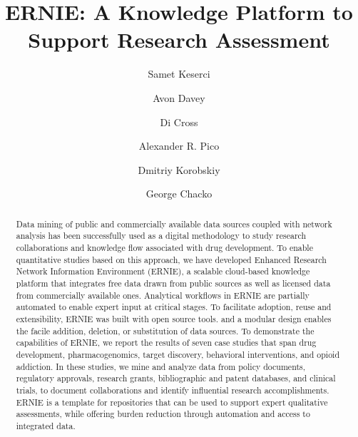 \documentclass[review]{elsarticle}
\begin{document}
\begin{frontmatter}

\title{ERNIE: A Knowledge Platform to Support Research Assessment}

\author[nl]{Samet Keserci}
\author[nl]{Avon Davey}
\author[ca]{Di Cross}
\author[gi]{Alexander R. Pico}
\author[nl]{Dmitriy Korobskiy}
\author[nl]{George Chacko }



\address[nl]{NETE Labs, NET ESolutions Corporation, McLean, VA, USA}
\address[ca]{Research Data Science \& Evaluation, Clarivate Analytics, USA}
\address[gi]{Gladstone Institutes, San Francisco, CA, USA}

\raggedright

\begin{abstract}

Data mining of public and commercially available data sources coupled with network analysis has been successfully used as a digital methodology to study research collaborations and knowledge flow associated with drug development. To enable quantitative studies based on this approach, we have developed Enhanced Research Network Information Environment (ERNIE), a scalable cloud-based knowledge platform that integrates free data drawn from public sources as well as licensed data from commercially available ones. Analytical workflows in ERNIE are partially automated to enable expert input at critical stages. To facilitate adoption, reuse and extensibility, ERNIE was built with open source tools. and a modular design enables the facile addition, deletion, or substitution of data sources. To demonstrate the capabilities of ERNIE, we report the results of seven case studies that span drug development, pharmacogenomics, target discovery, behavioral interventions, and opioid addiction. In these studies, we mine and analyze data from policy documents, regulatory approvals, research grants, bibliographic and patent databases, and clinical trials, to document collaborations and identify influential research accomplishments. ERNIE is a template for repositories that can be used to support expert qualitative assessments, while offering burden reduction through automation and access to integrated data.

\end{abstract}


\end{frontmatter}
\end{document}
